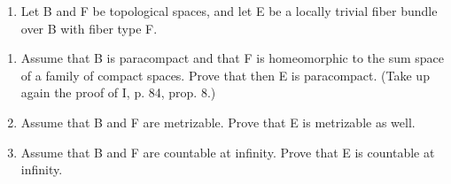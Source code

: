 \begin{enumerate}
\def\labelenumi{\arabic{enumi})}
\setcounter{enumi}{8}
\tightlist
\item
  Let B and F be topological spaces, and let E be a locally trivial fiber bundle over B with fiber type F.
\end{enumerate}

\begin{enumerate}
\def\labelenumi{\alph{enumi})}
\item
  Assume that B is paracompact and that F is homeomorphic to the sum space of a family of compact spaces. Prove that then E is paracompact. (Take up again the proof of I, p. 84, prop. 8.)
\item
  Assume that B and F are metrizable. Prove that E is metrizable as well.
\item
  Assume that B and F are countable at infinity. Prove that E is countable at infinity.
\end{enumerate}

